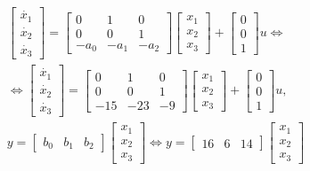 \documentclass[a5paper, 10pt]{article}
\theoremstyle{definition}
\theoremstyle{plain}
\theoremstyle{remark}
\begin{document}
\begin{multline}
\begin{bmatrix}
\dot{x_1}\\
\dot{x_2}\\
\dot{x_3}
\end{bmatrix}
=
\begin{bmatrix}
0 & 1 & 0\\
0 & 0 & 1\\
-a_0 & -a_1 & -a_2
\end{bmatrix}
\begin{bmatrix}
x_1\\
x_2\\
x_3
\end{bmatrix}
+
\begin{bmatrix}
0\\
0\\
1
\end{bmatrix}
u \Leftrightarrow\\
\Leftrightarrow
\begin{bmatrix}
\dot{x_1}\\
\dot{x_2}\\
\dot{x_3}
\end{bmatrix}
=
\begin{bmatrix}
0 & 1 & 0\\
0 & 0 & 1\\
-15 & -23 & -9
\end{bmatrix}
\begin{bmatrix}
x_1\\
x_2\\
x_3
\end{bmatrix}
+
\begin{bmatrix}
0\\
0\\
1
\end{bmatrix}
u,\\
 y = 
\begin{bmatrix}
b_0 & b_1 & b_2
\end{bmatrix}
\begin{bmatrix}
x_1\\
x_2\\
x_3
\end{bmatrix}\Leftrightarrow
 y = 
\begin{bmatrix}
16 & 6 & 14
\end{bmatrix}
\begin{bmatrix}
x_1\\
x_2\\
x_3
\end{bmatrix}
\end{multline}
\end{document}
